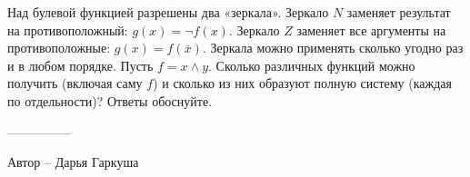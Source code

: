 \question
Над булевой функцией разрешены два «зеркала». Зеркало $N$ заменяет результат на противоположный: $g(x)=\neg f(x)$. Зеркало $Z$ заменяет все аргументы на противоположные: $g(x)=f(\overline{x})$. Зеркала можно применять сколько угодно раз и в любом порядке. Пусть $f=x\wedge y$. Сколько различных функций можно получить (включая саму $f$) и сколько из них образуют полную систему (каждая по отдельности)? Ответы обоснуйте.

---------------

Автор -- Дарья Гаркуша